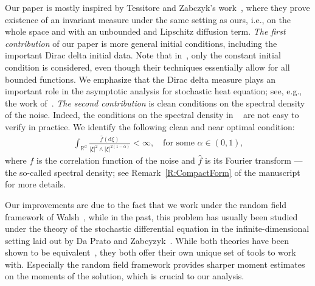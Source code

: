 \documentclass[12pt]{article}
\numberwithin{equation}{section}
\newcommand{\R}{\mathbb{R}}
\newcommand{\ud}{\ensuremath{\mathrm{d}}}
\begin{document}
Our paper is mostly inspired by Tessitore and Zabczyk's work~\cite{tessitore.zabczyk:98:invariant},
where they prove existence of an invariant measure under the same setting as ours, i.e., on the
whole space and with an unbounded and Lipschitz diffusion term. \textit{The first contribution} of
our paper is more general initial conditions, including the important Dirac delta initial data. Note
that in~\cite{tessitore.zabczyk:98:invariant}, only the constant initial condition is considered,
even though their techniques essentially allow for all bounded functions. We emphasize that the
Dirac delta measure plays an important role in the asymptotic analysis for stochastic heat equation;
see, e.g., the work of~\cite{amir.corwin.ea:11:probability}. \textit{The second contribution}
is clean conditions on the spectral density of the noise. Indeed, the conditions on the spectral
density in ~\cite{tessitore.zabczyk:98:invariant} are not easy to verify in practice. We identify the following clean and near
optimal condition:
\begin{align*}
  \int_{\R^d} \frac{\widehat{f}(\ud \xi)}{|\xi|^2 \wedge |\xi|^{2(1-\alpha)}} <\infty,
  \quad \text{for some $\alpha\in (0,1)$,}
\end{align*}
where $f$ is the correlation function of the noise and $\widehat{f}$ is its Fourier transform --- the
so-called spectral density; see Remark~\ref{R:CompactForm} of the manuscript for more details.


\vspace{.5em}


Our improvements are due to the fact that we work under the random field framework of
Walsh~\cite{walsh:86:introduction}, while in the past, this problem has usually been studied under
the theory of the stochastic differential equation in the infinite-dimensional setting laid out by
Da Prato and Zabcyzyk~\cite{da-prato.zabczyk:14:stochastic}. While both theories have been shown to
be equivalent~\cite{dalang.quer-sardanyons:11:stochastic}, they both offer their own unique set of
tools to work with. Especially the random field framework provides sharper moment estimates on the
moments of the solution, which is crucial to our analysis.
\end{document}
